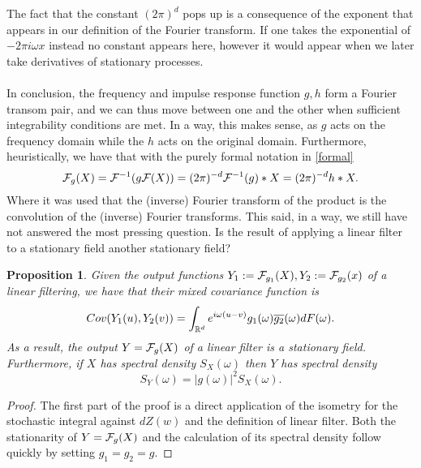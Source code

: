 \documentclass[12pt]{article}
\newtheorem{proposition}{Proposition}
\begin{document}
The fact that the constant $(2\pi)^d$ pops up is a consequence of the exponent that appears in our definition of the Fourier transform. If one takes the exponential of $-2\pi i\omega x$ instead no constant appears here, however it would appear when we later take derivatives of stationary processes.\\
\\
In conclusion, the frequency and impulse response function $g,h$ form a Fourier transom pair, and we can thus move between one and the other when sufficient integrability conditions are met. In a way, this makes sense, as $g$ acts on the frequency domain while the $h$ acts on the original domain. Furthermore, heuristically, we have that with the purely formal notation in \eqref{formal}
\begin{equation*}
	\mathcal{F}_g(X)=\mathcal{F}^{-1}(g\mathcal{F}(X))=(2\pi)^{-d}\mathcal{F}^{-1}(g)*X=(2\pi)^{-d}h*X.
\end{equation*}
Where it was used that the (inverse) Fourier transform of the product is the convolution of the (inverse) Fourier transforms.
This said,
in a way,  we still have not answered the most pressing question. Is the result of applying a linear filter to a stationary field another stationary field?

\begin{proposition}\label{dens linear filter}
	Given the output functions $Y_1:=\mathcal{F}_{g_1}(X),Y_2:=\mathcal{F}_{g_2}(x)$ of a linear filtering, we have that their mixed covariance function is
	\begin{equation*}
		Cov(Y_1(u),Y_2(v))=\int_{{\mathbb R}^d}e^{i\omega (u-v)}g_1(\omega)\overline{g_2}(\omega) dF(\omega)    .
	\end{equation*}
	As a result, the output $Y=\mathcal{F}_{g}(X)$ of a linear filter is a stationary field. Furthermore, if $X$ has spectral density  $S_X(\omega)$ then $Y$ has spectral density
	$$S_Y(\omega)=|g(\omega)|^2 S_X(\omega).$$
\end{proposition}
\begin{proof}
	The first part of the proof is a direct application of the isometry for the stochastic integral against $dZ(w)$ and the definition of linear filter. Both the stationarity of  $Y=\mathcal{F}_g(X)$ and the calculation of its spectral density follow quickly by setting $g_1=g_2=g$.
\end{proof}
\end{document}
